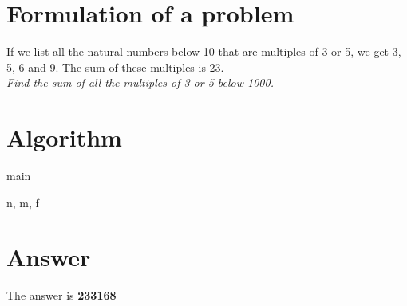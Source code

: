 \documentclass[12pt]{article}
\begin{document}
\maketitle

\section{Formulation of a problem}
If we list all the natural numbers below 10 that are multiples of 3 or 5, we
get 3, 5, 6 and 9. The sum of these multiples is 23. \\
\emph{Find the sum of all the multiples of 3 or 5 below 1000.}

\section{Algorithm}
\begin{eqcode}{main}{\ }{\ }{}
   \lend
\end{eqcode}

\begin{eqcode}{\gamma}{n, m}{, }{}
  f \gets \left \lfloor  {} \right \rfloor \lend
   \lend
\end{eqcode}

\section{Answer}
  The answer is \bf{233168}
\end{document}

